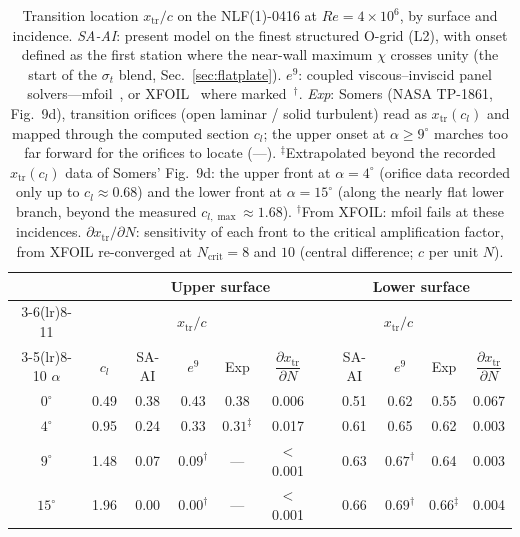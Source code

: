 \documentclass[journal]{new-aiaa}
\begin{document}
\begin{table}[tp]
  \centering
  \small
  \caption{Transition location $x_\mathrm{tr}/c$ on the NLF(1)-0416 at
  $Re\!=\!4\!\times\!10^6$, by surface and incidence. \emph{SA-AI}: present
  model on the finest structured O-grid (L2), with onset defined as the first
  station where the near-wall maximum $\chi$ crosses unity (the start of the
  $\sigma_t$ blend, Sec.~\ref{sec:flatplate}). \emph{$e^9$}: coupled viscous--inviscid
  panel solvers---mfoil~\cite{fidkowski_mfoil_2022}, or
  XFOIL~\cite{drela_xfoil_1989} where marked~$^\dagger$. \emph{Exp}: Somers
  (NASA TP-1861, Fig.~9d), transition orifices (open laminar / solid turbulent)
  read as $x_\mathrm{tr}(c_l)$ and mapped through the computed section $c_l$; the
  upper onset at $\alpha\!\geq\!9^\circ$ marches too far forward for the orifices
  to locate (---). $^\ddagger$Extrapolated beyond the recorded
  $x_\mathrm{tr}(c_l)$ data of Somers' Fig.~9d: the upper front at
  $\alpha\!=\!4^\circ$ (orifice data recorded only up to
  $c_l\!\approx\!0.68$) and the lower front at $\alpha\!=\!15^\circ$ (along the
  nearly flat lower branch, beyond the measured $c_{l,\max}\!\approx\!1.68$).
  $^\dagger$From XFOIL: mfoil fails at these incidences.
  $\partial x_\mathrm{tr}/\partial N$: sensitivity of each front to the
  critical amplification factor, from XFOIL re-converged at
  $N_\mathrm{crit}\!=\!8$ and $10$ (central difference; $c$ per unit $N$).}
  \label{tab:nlftrans}
  \begin{tabular}{cc cccc c cccc}
    \toprule
    & & \multicolumn{4}{c}{Upper surface} & & \multicolumn{4}{c}{Lower surface}\\
    \cmidrule(lr){3-6}\cmidrule(lr){8-11}
    & & \multicolumn{3}{c}{$x_\mathrm{tr}/c$} & & & \multicolumn{3}{c}{$x_\mathrm{tr}/c$} & \\
    \cmidrule(lr){3-5}\cmidrule(lr){8-10}
    $\alpha$ & $c_l$ & SA-AI & $e^9$ & Exp & $\dfrac{\partial x_\mathrm{tr}}{\partial N}$ & & SA-AI & $e^9$ & Exp & $\dfrac{\partial x_\mathrm{tr}}{\partial N}$ \\
    \midrule
    $0^\circ$  & 0.49 & 0.38 & 0.43 & 0.38 & 0.006 & & 0.51 & 0.62 & 0.55 & 0.067 \\
    $4^\circ$  & 0.95 & 0.24 & 0.33 & $0.31^\ddagger$ & 0.017 & & 0.61 & 0.65 & 0.62 & 0.003 \\
    $9^\circ$  & 1.48 & 0.07 & $0.09^\dagger$ & ---  & $<$0.001 & & 0.63 & $0.67^\dagger$ & 0.64 & 0.003 \\
    $15^\circ$ & 1.96 & 0.00 & $0.00^\dagger$ & ---  & $<$0.001 & & 0.66 & $0.69^\dagger$ & $0.66^\ddagger$ & 0.004 \\
    \bottomrule
  \end{tabular}
\end{table}
\end{document}
